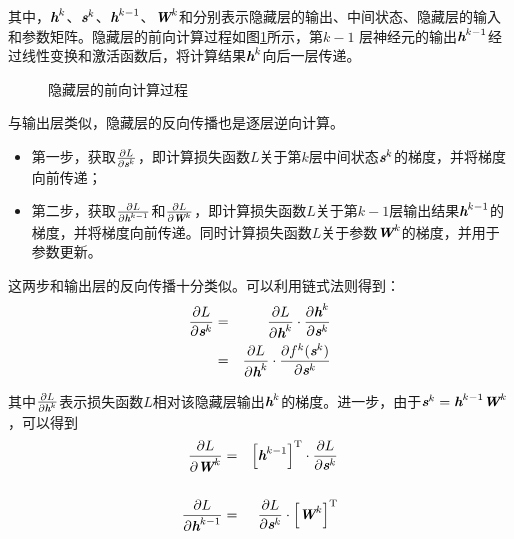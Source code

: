\noindent  其中，$ {\textbf{\em h}}^k $、$ {\textbf{\em s}}^k $、$ {\textbf{\em h}}^{k-1} $、${\textbf{\em W}}^k $和分别表示隐藏层的输出、中间状态、隐藏层的输入和参数矩阵。隐藏层的前向计算过程如图\ref{fig:9-56}所示，第$ k-1 $ 层神经元的输出$  {\textbf{\em h}}^{k-1} $经过线性变换和激活函数后，将计算结果$ {\textbf{\em h}}^k $向后一层传递。

\begin{figure}[htp]
\centering

\caption{隐藏层的前向计算过程}
\label{fig:9-56}
\end{figure}

\parinterval  与输出层类似，隐藏层的反向传播也是逐层逆向计算。

\begin{itemize}
\vspace{0.5em}
\item 第一步，获取$\frac{\partial L}{\partial {\textbf{\em s}}^k} $，即计算损失函数$ L $关于第$ k $层中间状态$ {\textbf{\em s}}^k$的梯度，并将梯度向前传递；
\vspace{0.5em}
\item 第二步，获取$\frac{\partial L}{\partial {\textbf{\em h}}^{k-1}} $和$\frac{\partial L}{\partial {\textbf{\em W}}^k} $，即计算损失函数$ L $关于第$ k-1 $层输出结果$ {\textbf{\em h}}^{k-1} $的梯度，并将梯度向前传递。同时计算损失函数$ L $关于参数$ {\textbf{\em W}}^k $的梯度，并用于参数更新。
\vspace{0.5em}
\end{itemize}

\parinterval  这两步和输出层的反向传播十分类似。可以利用链式法则得到：
\begin{eqnarray}
\frac{\partial L}{\partial {\textbf{\em s}}^k}&=&\frac{\partial L}{\partial {\textbf{\em h}}^k}\cdot \frac{\partial {\textbf{\em h}}^k}{\partial {\textbf{\em s}}^k}\nonumber\\
&=&\frac{\partial L}{\partial {\textbf{\em h}}^k}\cdot \frac{\partial f^k({\textbf{\em s}}^k)}{\partial {\textbf{\em s}}^k}
\label{eq:9-54}
\end{eqnarray}

\noindent  其中$ \frac{\partial L}{\partial {\textbf{\em h}}^k} $表示损失函数$ L $相对该隐藏层输出${\textbf{\em h}}^k $的梯度。进一步，由于$ {\textbf{\em s}}^k ={\textbf{\em h}}^{k-1}{\textbf{\em W}}^k$，可以得到
\begin{eqnarray}
\frac{\partial L}{\partial {\textbf{\em W}}^k}&=&{\left[{\textbf{\em h}}^{k-1}\right]}^{\textrm T}\cdot \frac{\partial L}{\partial {\textbf{\em s}}^k}\label{eq:9-55}\\ \nonumber\\
\frac{\partial L}{\partial {\textbf{\em h}}^{k-1}}&= &\frac{\partial L}{\partial {\textbf{\em s}}^k} \cdot {\left[{\textbf{\em W}}^k\right]}^{\textrm T}
\label{eq:9-56}
\end{eqnarray}

